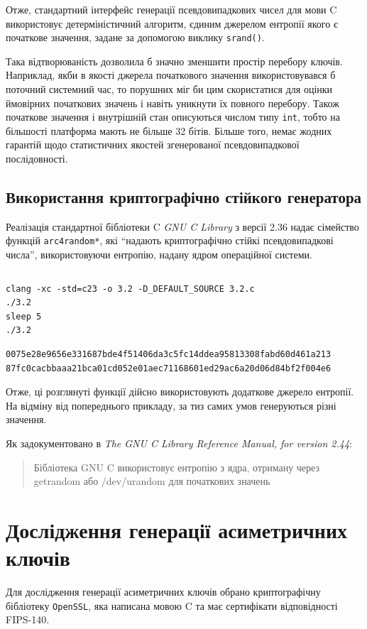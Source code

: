 \documentclass{kpi-lab}
\begin{document}
Отже, стандартний інтерфейс генерації псевдовипадкових
чисел для мови C використовує детерміністичний алгоритм, єдиним
джерелом ентропії якого є початкове значення, задане за
допомогою виклику \texttt{srand()}.

Така відтворюваність дозволила б значно зменшити простір
перебору ключів.
Наприклад, якби в якості джерела початкового значення
використовувався б поточний
системний час, то порушних міг би цим скористатися для
оцінки ймовірних початкових значень і навіть уникнути їх
повного перебору. Також початкове значення і внутрішній
стан описуються числом типу \texttt{int}, тобто на
більшості платформа мають не більше 32 бітів.
Більше того, немає жодних гарантій щодо статистичних
якостей згенерованої псевдовипадкової послідовності.

\section{Використання криптографічно стійкого генератора}

Реалізація стандартної бібліотеки C \emph{GNU C Library}
з версії 2.36 надає сімейство функцій \texttt{arc4random*},
які \enquote{надають криптографічно стійкі псевдовипадкові числа},
використовуючи ентропію, надану ядром операційної системи.

\inputminted{c}{3.2.c}
\begin{verbatim}
clang -xc -std=c23 -o 3.2 -D_DEFAULT_SOURCE 3.2.c
./3.2
sleep 5
./3.2
\end{verbatim}
\begin{verbatim}
0075e28e9656e331687bde4f51406da3c5fc14ddea95813308fabd60d461a213
87fc0cacbbaaa21bca01cd052e01aec71168601ed29ac6a20d06d84bf2f004e6
\end{verbatim}

Отже, ці розглянуті функції дійсно використовують додаткове
джерело ентропії.
На відміну від попереднього прикладу, за тиз самих умов
генеруються різні значення.

Як задокументовано в \emph{The GNU C Library Reference
Manual, for version 2.44}:
\blockquote{
  Бібліотека GNU C використовує ентропію з ядра,
  отриману через getrandom або /dev/urandom для початкових значень
}.

\chapter{Дослідження генерації асиметричних ключів}

Для дослідження генерації асиметричних ключів обрано
криптографічну бібліотеку \texttt{OpenSSL},
яка написана мовою C та має сертифікати відповідності FIPS-140.
\end{document}
